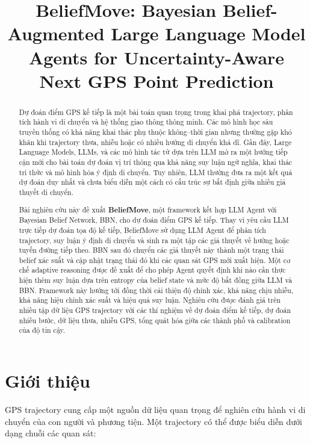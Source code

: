 \documentclass[11pt,a4paper]{article}
\title{
	\textbf{
		BeliefMove: Bayesian Belief-Augmented Large Language Model Agents
		for Uncertainty-Aware Next GPS Point Prediction
	}
}
\author{}
\date{}
\begin{document}
	
	\maketitle
	
	\begin{abstract}
		
		Dự đoán điểm GPS kế tiếp là một bài toán quan trọng trong khai phá
		trajectory, phân tích hành vi di chuyển và hệ thống giao thông thông minh.
		Các mô hình học sâu truyền thống có khả năng khai thác phụ thuộc
		không--thời gian nhưng thường gặp khó khăn khi trajectory thưa, nhiễu hoặc
		có nhiều hướng di chuyển khả dĩ. Gần đây, Large Language Models, LLMs,
		và các mô hình tác tử dựa trên LLM mở ra một hướng tiếp cận mới cho bài
		toán dự đoán vị trí thông qua khả năng suy luận ngữ nghĩa, khai thác tri
		thức và mô hình hóa ý định di chuyển. Tuy nhiên, LLM thường đưa ra một
		kết quả dự đoán duy nhất và chưa biểu diễn một cách có cấu trúc sự bất định
		giữa nhiều giả thuyết di chuyển.
		
		Bài nghiên cứu này đề xuất \textbf{BeliefMove}, một framework kết hợp
		LLM Agent với Bayesian Belief Network, BBN, cho dự đoán điểm GPS kế tiếp.
		Thay vì yêu cầu LLM trực tiếp dự đoán tọa độ kế tiếp, BeliefMove sử dụng
		LLM Agent để phân tích trajectory, suy luận ý định di chuyển và sinh ra
		một tập các giả thuyết về hướng hoặc tuyến đường tiếp theo. BBN sau đó
		chuyển các giả thuyết này thành một trạng thái belief xác suất và cập nhật
		trạng thái đó khi các quan sát GPS mới xuất hiện. Một cơ chế adaptive
		reasoning được đề xuất để cho phép Agent quyết định khi nào cần thực hiện
		thêm suy luận dựa trên entropy của belief state và mức độ bất đồng giữa
		LLM và BBN. Framework này hướng tới đồng thời cải thiện độ chính xác,
		khả năng chịu nhiễu, khả năng hiệu chỉnh xác suất và hiệu quả suy luận.
		Nghiên cứu được đánh giá trên nhiều tập dữ liệu GPS trajectory với các
		thí nghiệm về dự đoán điểm kế tiếp, dự đoán nhiều bước, dữ liệu thưa,
		nhiễu GPS, tổng quát hóa giữa các thành phố và calibration của độ tin cậy.
		
	\end{abstract}
	
	\section{Giới thiệu}
	
	GPS trajectory cung cấp một nguồn dữ liệu quan trọng để nghiên cứu hành
	vi di chuyển của con người và phương tiện. Một trajectory có thể được
	biểu diễn dưới dạng chuỗi các quan sát:
	
\end{document}
